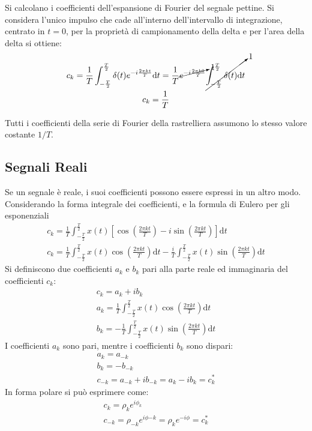 \documentclass{article}
\newcommand{\df}{\mathrm{d}}
\numberwithin{equation}{subsection}
\begin{document}
Si calcolano i coefficienti dell'espansione di Fourier del segnale pettine. Si considera l'unico impulso che cade all'interno dell'intervallo di integrazione, centrato 
in $t=0$, per la proprietà di campionamento della delta e per l'area della delta si ottiene:
\begin{gather*}
    c_k=\displaystyle\frac{1}{T}\int_{-\frac{T}{2}}^{\frac{T}{2}}\delta(t)e^{-i\frac{2\pi kt}{T}}\df t=\frac{1}{T}\cancelto{1}{e^{-i{\frac{2\pi k0}{T}}}}\cancelto{1}{\int_{-\frac{T}{2}}^{\frac{T}{2}}\delta(t)\df t}\\
    c_k=\displaystyle\frac{1}{T}
\end{gather*}

Tutti i coefficienti della serie di Fourier della rastrelliera assumono lo stesso valore costante $1/T$. 

\subsection{Segnali Reali}
Se un segnale è reale, i suoi coefficienti possono essere espressi in un altro modo. Considerando la forma integrale dei coefficienti, e la formula di Eulero per gli 
esponenziali
\begin{gather*}
    c_k=\displaystyle\frac{1}{T}\int_{-\frac{T}{2}}^{\frac{T}{2}}x(t)\left[\cos\left(\frac{2\pi kt}{T}\right)-i\sin\left(\frac{2\pi kt}{T}\right)\right]\df t\\
    c_k=\displaystyle\frac{1}{T}\int_{-\frac{T}{2}}^{\frac{T}{2}}x(t)\cos\left(\frac{2\pi kt}{T}\right)\df t-\frac{i}{T}\int_{-\frac{T}{2}}^{\frac{T}{2}}x(t)\sin\left(\frac{2\pi kt}{T}\right)\df t
\end{gather*}
Si definiscono due coefficienti $a_k$ e $b_k$ pari alla parte reale ed immaginaria del coefficienti $c_k$:
\begin{gather*}
    c_k=a_k+ib_k\\
    a_k=\displaystyle\frac{1}{T}\int_{-\frac{T}{2}}^{\frac{T}{2}}x(t)\cos\left(\frac{2\pi kt}{T}\right)\df t\\
    b_k=\displaystyle-\frac{1}{T}\int_{-\frac{T}{2}}^{\frac{T}{2}}x(t)\sin\left(\frac{2\pi kt}{T}\right)\df t
\end{gather*}
I coefficienti $a_k$ sono pari, mentre i coefficienti $b_k$ sono dispari:
\begin{gather*}
    a_k=a_{-k}\\
    b_k=-b_{-k}\\
    c_{-k}=a_{-k}+ib_{-k}=a_{k}-ib_k=c_k^*
\end{gather*}
In forma polare si può esprimere come:
\begin{gather*}
    c_k=\rho_k e^{i\phi_k}\\
    c_{-k}=\rho_{-k}e^{i\phi{-k}}=\rho_k e^{-i\phi}=c_k^*
\end{gather*}
\end{document}

